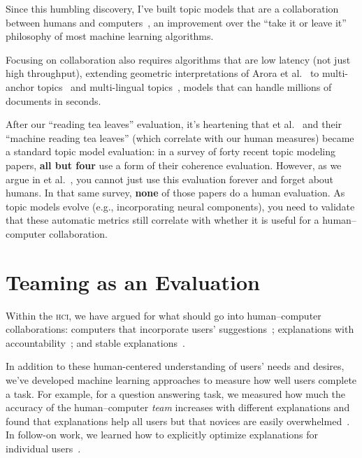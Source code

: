 \documentclass[11pt]{amsart}
\newcommand{\abr}[1]{\textsc{#1}}
\newcommand{\newcite}[2]{\capitalisewords{#1} et al.~\cite{#1-#2}}
\begin{document}
Since this humbling discovery, I've built topic models that are a
collaboration between humans and computers~\cite{hu-14:itm}, an
improvement over the ``take it or leave it'' philosophy of most
machine learning algorithms.

Focusing on collaboration also requires algorithms that are low
latency (not just high throughput), extending
geometric interpretations of Arora et
al.~\cite{arora-12} to multi-anchor topics~\cite{lund-17} and
multi-lingual topics~\cite{Yuan-18}, models that can handle millions of documents in seconds.
%

After our ``reading tea leaves'' evaluation, it's
heartening that \newcite{lau}{14} and their ``machine reading tea
leaves'' (which correlate with our human measures) became a standard
topic model evaluation: in a survey of forty recent topic modeling
papers, {\bf all but four} use a form of their coherence evaluation.
%
However, as we argue in \newcite{hoyle}{21}, you cannot just use this
evaluation forever and forget about humans.
%
In that same survey, {\bf none} of those papers do a human evaluation.
%
As topic models evolve (e.g., incorporating
neural components), you need to validate that these automatic metrics
still correlate with whether it is useful for a human--computer
collaboration.

\section{Teaming as an Evaluation}

Within the \abr{hci}, we have argued for 
what should go into human--computer collaborations: computers that incorporate
users' suggestions~\cite{kumar-19}; explanations with
accountability~\cite{smith-20}; and stable
explanations~\cite{smith-20:adherence}.

In addition to these human-centered understanding of users' needs and
desires, we've developed machine learning approaches to measure how
well users complete a task.
%
For example, for a question answering task, we measured how much the
accuracy of the human--computer \emph{team} increases with different
explanations and found that explanations help all users but that
novices are easily overwhelmed~\cite{feng-19}.
%
In follow-on work, we learned how to explicitly optimize explanations
for individual users~\cite{feng-22}.
\end{document}
